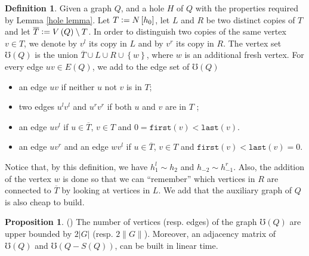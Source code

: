 \documentclass{article}
\theoremstyle{definition}
\newtheorem{prop}[thm]{Proposition}
\newtheorem{defn}[thm]{Definition}
\newcommand{\defeq}{\vcentcolon=}
\begin{document}
    \begin{defn} \label{aux graph}
        Given a graph $Q$, 
        and a hole $H$ of $Q$ 
        with the properties
        required by Lemma \ref{hole lemma}. Let
        $T \defeq N\left[h_0\right]$,
        let $L$ and $R$ be two distinct
        copies of $T$ and
        let $\overline{T} \defeq V\left(Q\right) \setminus T$.
        In order to distinguish
        two copies of the same
        vertex $v \in T$,
        we denote by $v^{l}$ 
        its copy in $L$ 
        and by $v^{r}$ its 
        copy in $R$.
        The vertex set $\mho\left(Q\right)$
        is the union $\overline{T} \cup L \cup R \cup \left\{w\right\}$,
        where $w$ is an additional fresh vertex.
        For every edge $uv \in E\left(Q\right)$,
        we add to the edge set
        of $\mho\left(Q\right)$
        \begin{itemize}
            \item an edge $uv$ if neither $u$ not $v$ is in $T$;
            \item two edges $u^{l}v^{l}$ and $u^{r}v^{r}$ 
                if both $u$ and $v$ are in $T$ ;
            \item an edge $uv^{l}$ if $u \in \overline{T}$,
                $v \in T$ and $0 = \texttt{first}\left(v\right)
                < \texttt{last}\left(v\right)$.
            \item an edge $uv^{r}$ and
                an edge $wv^{l}$ 
                if $u \in \overline{T}$,
            $v \in T$ and $\texttt{first}\left(v\right)
            < \texttt{last}\left(v\right) = 0$.
        \end{itemize}
    \end{defn}
    
    Notice that, by this definition, 
    we have $h_1^{l} \sim h_{2}$ and
    $h_{-2} \sim h_{-1}^{r}$.
    Also, the addition
    of the vertex $w$ is done so that 
    we can ``remember'' 
    which vertices in $R$ are
    connected to $\overline{T}$ 
    by looking at vertices in $L$.
    We add that the auxiliary graph of $Q$ is also
    cheap to build. 

    \begin{prop} (\cite{main})
        The number of vertices (resp. edges) of the graph
        $\mho\left(Q\right)$ are upper bounded 
        by $2 \left|G\right|$ (resp. $2 \|G\|$).
        Moreover, an adjacency matrix of $\mho\left(Q\right)$
        and $\mho\left(Q - S\left(Q\right)\right)$,
        can be built in linear time.
    \end{prop}
\end{document}
